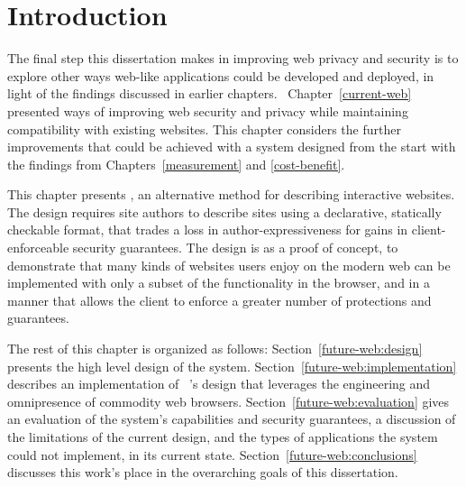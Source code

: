 \section{Introduction}
\label{future-web:introduction}

The final step this dissertation makes in improving web privacy and security is
to explore other ways web-like applications could be developed and deployed, in
light of the findings discussed in earlier chapters.  Chapter~\ref{current-web}
presented ways of improving web security and privacy while maintaining
compatibility with existing websites. This chapter considers the further
improvements that could be achieved with a system designed from the start with
the findings from Chapters~\ref{measurement} and \ref{cost-benefit}.

This chapter presents \CDF, an alternative method for describing interactive
websites. The design requires site authors to describe sites using a
declarative, statically checkable format, that trades a loss in
author-expressiveness for gains in client-enforceable security guarantees.  The
design is as a proof of concept, to demonstrate that many kinds of websites
users enjoy on the modern web can be implemented with only a subset of the
functionality in the browser, and in a manner that allows the client to enforce
a greater number of protections and guarantees.

The rest of this chapter is organized as follows:
Section~\ref{future-web:design} presents the high level design of the system.
Section~\ref{future-web:implementation} describes an implementation of \CDF~'s
design that leverages the engineering and omnipresence of commodity web
browsers.  Section~\ref{future-web:evaluation} gives an evaluation of the
system's capabilities and security guarantees, a discussion of the limitations
of the current design, and the types of applications the system could not
implement, in its current state.  Section~\ref{future-web:conclusions}
discusses this work's place in the overarching goals of this dissertation.
